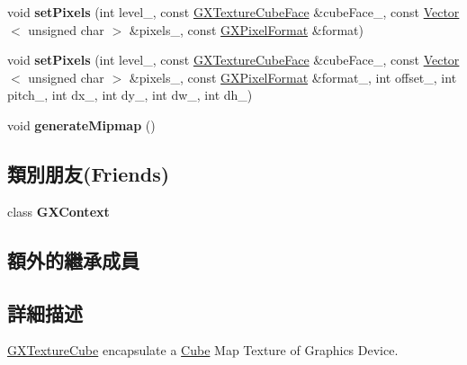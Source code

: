 \begin{DoxyCompactItemize}
\item 
void {\bfseries set\+Pixels} (int level\+\_\+, const \hyperlink{class_i_dream_sky_1_1_g_x_texture_cube_face}{G\+X\+Texture\+Cube\+Face} \&cube\+Face\+\_\+, const \hyperlink{class_i_dream_sky_1_1_vector}{Vector}$<$ unsigned char $>$ \&pixels\+\_\+, const \hyperlink{class_i_dream_sky_1_1_g_x_pixel_format}{G\+X\+Pixel\+Format} \&format)\hypertarget{class_i_dream_sky_1_1_g_x_texture_cube_ad259002b161a9325a4a4845e308e20d6}{}\label{class_i_dream_sky_1_1_g_x_texture_cube_ad259002b161a9325a4a4845e308e20d6}

\item 
void {\bfseries set\+Pixels} (int level\+\_\+, const \hyperlink{class_i_dream_sky_1_1_g_x_texture_cube_face}{G\+X\+Texture\+Cube\+Face} \&cube\+Face\+\_\+, const \hyperlink{class_i_dream_sky_1_1_vector}{Vector}$<$ unsigned char $>$ \&pixels\+\_\+, const \hyperlink{class_i_dream_sky_1_1_g_x_pixel_format}{G\+X\+Pixel\+Format} \&format\+\_\+, int offset\+\_\+, int pitch\+\_\+, int dx\+\_\+, int dy\+\_\+, int dw\+\_\+, int dh\+\_\+)\hypertarget{class_i_dream_sky_1_1_g_x_texture_cube_afba12ebcd067cd975742f901c56c9f9c}{}\label{class_i_dream_sky_1_1_g_x_texture_cube_afba12ebcd067cd975742f901c56c9f9c}

\item 
void {\bfseries generate\+Mipmap} ()\hypertarget{class_i_dream_sky_1_1_g_x_texture_cube_ae481abe8d13f382c57c6f3d0380e96de}{}\label{class_i_dream_sky_1_1_g_x_texture_cube_ae481abe8d13f382c57c6f3d0380e96de}

\end{DoxyCompactItemize}
\subsection*{類別朋友(Friends)}
\begin{DoxyCompactItemize}
\item 
class {\bfseries G\+X\+Context}\hypertarget{class_i_dream_sky_1_1_g_x_texture_cube_a2c36d7f8865080802bbad88cd73d871c}{}\label{class_i_dream_sky_1_1_g_x_texture_cube_a2c36d7f8865080802bbad88cd73d871c}

\end{DoxyCompactItemize}
\subsection*{額外的繼承成員}


\subsection{詳細描述}
\hyperlink{class_i_dream_sky_1_1_g_x_texture_cube}{G\+X\+Texture\+Cube} encapsulate a \hyperlink{class_i_dream_sky_1_1_cube}{Cube} Map Texture of Graphics Device. 

